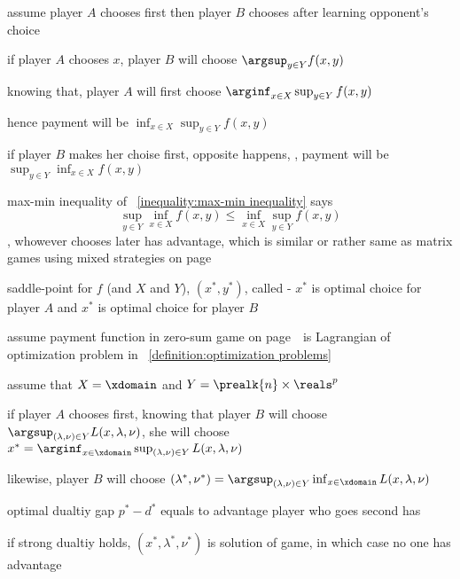 \documentclass[17pt,landscape]{foils}
\begin{document}
{\vitem
	assume player $A$ chooses first
	then player $B$ chooses after learning opponent's choice
	\bit
	\item
		if player $A$ chooses $x$, player $B$ will choose $\argsup_{y\in Y} f(x,y)$
	\item
		knowing that, player $A$ will first choose $\arginf_{x\in X} \sup_{y\in Y} f(x,y)$
	\item
		hence payment will be $\inf_{x\in X} \sup_{y\in Y} f(x,y)$
	\eit

\vitem
	if player $B$ makes her choise first, opposite happens, \ie,
	payment will be $\sup_{y\in Y} \inf_{x\in X} f(x,y)$

\vitem
	max-min inequality of \inequalityname~\ref{inequality:max-min inequality} says
	$$
		\sup_{y\in Y} \inf_{x\in X} f(x,y)
			\leq
		\inf_{x\in X} \sup_{y\in Y} f(x,y)
	$$
	\ie, whowever chooses later has advantage,
	which is similar or rather same as
	matrix games using mixed strategies on page~\pageref{page:Matrix games using mixed strategies}\

\vitem
	saddle-point for $f$ (and $X$ and $Y$),
	$(x^\ast,y^\ast)$,
	called 
	- $x^\ast$ is optimal choice for player $A$
		and
	$x^\ast$ is optimal choice for player $B$
\eit



\bit
\item
	assume payment function in zero-sum game on page~\pageref{page:Game interpretation}\
	is Lagrangian of optimization problem
	in ~\ref{definition:optimization problems}

\vitem
	assume that $X=\xdomain$ and $Y=\prealk{n} \times \reals^p$

\vitem
	if player $A$ chooses first, knowing that player $B$ will choose $\argsup_{(\lambda,\nu)\in Y}L(x,\lambda,\nu)$,
	she will choose $x^\ast = \arginf_{x\in\xdomain} \sup_{(\lambda,\nu)\in Y}L(x,\lambda,\nu)$

\vitem
	likewise, player $B$ will choose
	$(\lambda^\ast,\nu^\ast) = \argsup_{(\lambda,\nu)\in Y} \inf_{x\in\xdomain} L(x,\lambda,\nu)$

\vitem
	optimal dualtiy gap $p^\ast - d^\ast$ equals to advantage player who goes second has

\vitem
	if strong dualtiy holds, $(x^\ast, \lambda^\ast, \nu^\ast)$ is solution of game,
	in which case no one has advantage
\eit
\vfill



}
\end{document}
